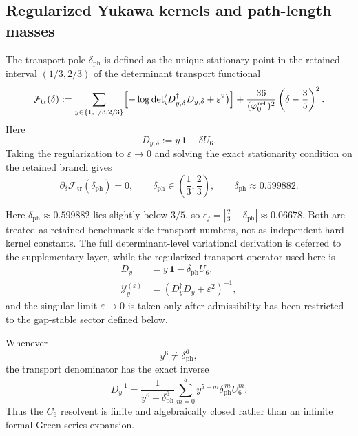 \subsection{Regularized Yukawa kernels and path-length masses}

\begin{definition}
The transport pole $\delta_{\mathrm{ph}}$ is defined as the unique stationary point in the retained interval $(1/3,2/3)$ of the determinant transport functional
\[
\mathcal F_{\mathrm{tr}}(\delta)
:=
\sum_{y\in\{1,1/3,2/3\}}
\Bigl[-\log\det\!\bigl(D_{y,\delta}^\dagger D_{y,\delta}+\varepsilon^2\bigr)\Bigr]
+
\frac{36}{(\varphi_0^{\mathrm{ret}})^2}\left(\delta-\frac35\right)^2.
\]
Here
\[
D_{y,\delta}:=y\,\mathbf 1-\delta U_6.
\]
Taking the regularization to $\varepsilon\to0$ and solving the exact stationarity condition on the retained branch gives
\begin{equation}
\label{eq:transport-bridge-offset}
\partial_\delta \mathcal F_{\mathrm{tr}}(\delta_{\mathrm{ph}})=0,
\qquad
\delta_{\mathrm{ph}}\in\left(\frac13,\frac23\right),
\qquad
\delta_{\mathrm{ph}}\approx \num{0.599882}.
\end{equation}
\end{definition}

Here $\delta_{\mathrm{ph}}\approx \num{0.599882}$ lies slightly below $3/5$, so $\epsilon_f=|\frac23-\delta_{\mathrm{ph}}|\approx \num{0.06678}$. Both are treated as retained benchmark-side transport numbers, not as independent hard-kernel constants. The full determinant-level variational derivation is deferred to the supplementary layer, while the regularized transport operator used here is
\begin{equation}
\label{eq:yukawa-kernel}
\begin{aligned}
D_y&=y\,\mathbf 1-\delta_{\mathrm{ph}}U_6,\\
\mathcal Y_y^{(\varepsilon)}&=(D_y^\dagger D_y+\varepsilon^2)^{-1},
\end{aligned}
\end{equation}
and the singular limit $\varepsilon\to0$ is taken only after admissibility has been restricted to the gap-stable sector defined below.

\begin{proposition}
\label{prop:finite-hexagonal-resolvent}
Whenever
\[
y^6\neq \delta_{\mathrm{ph}}^6,
\]
the transport denominator has the exact inverse
\begin{equation}
\label{eq:finite-hexagonal-resolvent}
D_y^{-1}
=
\frac{1}{y^6-\delta_{\mathrm{ph}}^6}
\sum_{m=0}^{5}y^{5-m}\delta_{\mathrm{ph}}^{\,m}U_6^m.
\end{equation}
Thus the $C_6$ resolvent is finite and algebraically closed rather than an infinite formal Green-series expansion.
\end{proposition}

